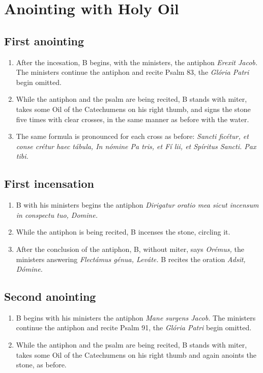 \documentclass[twocolumn]{report}
\begin{document}
\section*{Anointing with Holy Oil}
\subsection*{First anointing}
\begin{enumerate}
	\item After the incesation, B begins, with the ministers, the antiphon \textit{Erexit Jacob.} The ministers continue the antiphon and recite Psalm 83, the \textit{Glória Patri} begin omitted.
	\item While the antiphon and the psalm are being recited, B stands with miter, takes some Oil of the Catechumens on his right thumb, and signs the stone five times with clear crosses, in the same manner as before with the water. 
	\item The same formula is pronounced for each cross as before: \textit{Sancti  ficétur, et conse  crétur haec tábula, In nómine Pa  tris, et Fí  lii, et Spíritus  Sancti. Pax tibi.}
\end{enumerate}
\subsection*{First incensation}
\begin{enumerate}
	\item B with his ministers begins the antiphon \textit{Dirigatur oratio mea sicut incensum in conspectu tuo, Domine.}
	\item While the antiphon is being recited, B incenses the stone, circling it.
	\item After the conclusion of the antiphon, B, without miter, says \textit{Orémus,} the ministers answering \textit{Flectámus génua, Leváte.} B recites the oration \textit{Adsit, Dómine.}
\end{enumerate}
\subsection*{Second anointing}
\begin{enumerate}
	\item B begins with his ministers the antiphon \textit{Mane surgens Jacob.} The ministers continue the antiphon and recite Psalm 91, the \textit{Glória Patri} begin omitted.
	\item While the antiphon and the psalm are being recited, B stands with miter, takes some Oil of the Catechumens on his right thumb and again anoints the stone, as before.
\end{enumerate}
\end{document}
